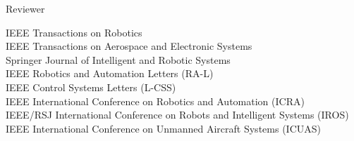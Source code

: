 

\begin{cvskills}

  \cvskill
    {Reviewer} %
    {\begin{minipage}[t]{\linewidth}\baselineskip
    		IEEE Transactions on Robotics \\
    		IEEE Transactions on Aerospace and Electronic Systems \\
    		Springer Journal of Intelligent and Robotic Systems \\
    		IEEE Robotics and Automation Letters (RA-L) \\
    		IEEE Control Systems Letters (L-CSS) \\
 		IEEE International Conference on Robotics and Automation (ICRA) \\
 		IEEE/RSJ International Conference on Robots and Intelligent Systems (IROS) \\
 		IEEE International Conference on Unmanned Aircraft Systems (ICUAS) \end{minipage}}

\end{cvskills}
